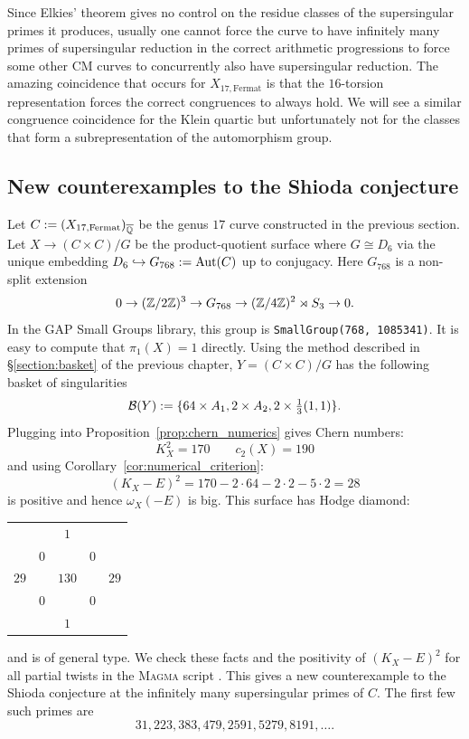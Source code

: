 \documentclass[main.tex]{subfiles}
\begin{document}
Since Elkies' theorem gives no control on the residue classes of the supersingular primes it produces, usually one cannot force the curve to have infinitely many primes of supersingular reduction in the correct arithmetic progressions to force some other CM curves to concurrently also have supersingular reduction.
The amazing coincidence that occurs for $X_{17, \mathrm{Fermat}}$ is that the $16$-torsion representation forces the correct congruences to always hold. We will see a similar congruence coincidence for the Klein quartic but unfortunately not for the classes that form a subrepresentation of the automorphism group.


\subsection{New counterexamples to the Shioda conjecture} \label{section:new_counterexamples}

Let $C := (X_{17, \mathrm{Fermat}})_{\overline{\mathbb{Q}}}$ be the genus $17$ curve constructed in the previous section. Let $X \to (C \times C)/G$ be the product-quotient surface where $G \cong D_6$ via the unique embedding $D_6 \hookrightarrow G_{768} := \operatorname{\mathrm{Aut}}(C)$ up to conjugacy. Here $G_{768}$ is a non-split extension
\[ 0 \to (\mathbb{Z}/2\mathbb{Z})^3 \to G_{768} \to (\mathbb{Z}/4\mathbb{Z})^2 \rtimes S_3 \to 0. \]
In the GAP Small Groups library, this group is \texttt{SmallGroup(768, 1085341)}. It is easy to compute that $\pi_1(X) = 1$ directly. Using the method described in \S\ref{section:basket} of the previous chapter, $Y = (C \times C)/G$ has the following basket of singularities
\[ \mathcal{B}(Y) := \{ 64 \times A_1, 2 \times A_2, 2 \times \tfrac{1}{3} (1,1) \}. \]
Plugging into Proposition~\ref{prop:chern_numerics} gives Chern numbers:
\[ K_X^2 = 170 \quad \quad c_2(X) = 190 \]
and using Corollary~\ref{cor:numerical_criterion}:
\[ (K_X - E)^2 = 170 - 2 \cdot 64 - 2 \cdot 2 - 5 \cdot 2 = 28 \]
is positive and hence $\omega_X(-E)$ is big. This surface has Hodge diamond:
\begin{center}
\begin{tabular}{ccccc}
 &  & $1$ &  &  \\
 & $0$ &  & $0$ &  \\
$29$ &  & $130$ &  & $29$ \\
 & $0$ &  & $0$ &  \\
 &  & $1$ &  &  \\
\end{tabular}    
\end{center}
and is of general type. We check these facts and the positivity of $(K_X - E)^2$ for all partial twists in the \textsc{Magma} script \cite[\texttt{examples/group768.m}]{church:github}. This gives a new counterexample to the Shioda conjecture at the infinitely many supersingular primes of $C$. The first few such primes are 
\[ 31, 223, 383, 479, 2591, 5279, 8191, \dots. \]
\end{document}
